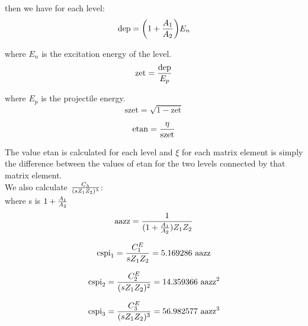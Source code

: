 \noindent then we have for each level:\\

\begin{equation}
\mathrm{dep} = \bigg( 1 + {A_1 \over A_2} \bigg) E_n
\end{equation}

\noindent where $E_n$ is the excitation energy of the level.\\

\begin{equation}
\mathrm{zet} = {\mathrm{dep} \over E_p}
\end{equation}

\noindent where $E_p$ is the projectile energy.\\

\begin{equation}
\mathrm{szet} = \sqrt{1 - \mathrm{zet}}
\end{equation}

\begin{equation}
\mathrm{etan} = {\eta \over \mathrm{szet}}
\end{equation}

\noindent The value etan is calculated for each level and $\xi$ for each
matrix element is simply the difference between the values of etan for the
two levels connected by that matrix element.\\

\noindent We also calculate ${C_\lambda \over (s Z_1 Z_2)^\lambda}$:\\

\noindent where s is $1 + {A_1 \over A_2}$\\

\begin{equation}
\mathrm{aazz} = {1 \over {(1 + {A_1 \over A_2})} Z_1 Z_2}
\end{equation}

\begin{equation}
\mathrm{cspi}_1 = {C_1^E \over s Z_1 Z_2} = 5.169286 ~\mathrm{aazz}
\end{equation}

\begin{equation}
\mathrm{cspi}_2 = {C_2^E \over (s Z_1 Z_2)^2} = 14.359366 ~\mathrm{aazz}^2
\end{equation}

\begin{equation}
\mathrm{cspi}_3 = {C_3^E \over (s Z_1 Z_2)^3} = 56.982577 ~\mathrm{aazz}^3
\end{equation}

